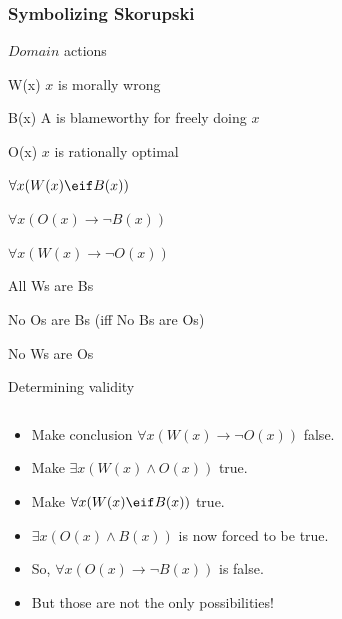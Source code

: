 \begin{frame}
\frametitle{Symbolizing Skorupski}

\begin{ekey}
\item[$Domain$] actions
\item[W(x)] $x$ is morally wrong
\item[B(x)] A is blameworthy for freely doing $x$
\item[O(x)] $x$ is rationally optimal
\end{ekey}
\begin{earg}
\item[] $\forall x(W(x) \eif B(x))$
\item[] $\forall x(O(x) \to \lnot B(x))$
\item[\therefore] $\forall x(W(x) \to \lnot O(x))$
\end{earg}

\begin{earg}
\item[] All Ws are Bs
\item[] No Os are Bs (iff No Bs are Os)
\item[\therefore] No Ws are Os
\end{earg}

\end{frame}

\begin{frame}{Determining validity}

  \begin{columns}
    \begin{column}{.5\textwidth}
      \begin{itemize}[<+->]
        \item Make conclusion $\forall x(W(x) \to \lnot O(x))$ false.
        \item Make $\exists x(W(x) \land O(x))$ true.
        \item Make $\forall x(W(x) \eif B(x))$ true.
        \item $\exists x(O(x) \land B(x))$ is now forced to be true.
        \item So, $\forall x(O(x) \to \lnot B(x))$ is false.
        \item But those are not the only possibilities!
      \end{itemize}
    \end{column}
    \begin{column}{.5\textwidth}
\end{column}
\end{columns}
\end{frame}

